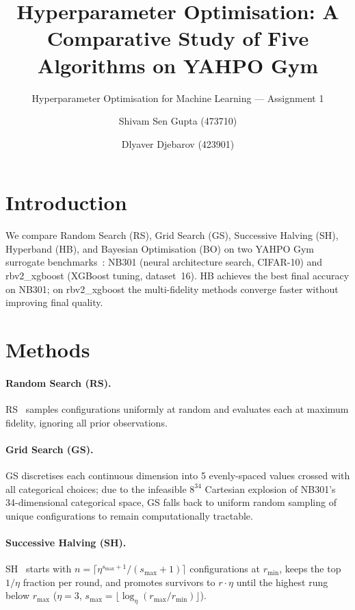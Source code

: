 \documentclass{AIM_report}
\title{Hyperparameter Optimisation: A Comparative Study of Five Algorithms on YAHPO Gym}
\subtitle{Hyperparameter Optimisation for Machine Learning --- Assignment 1}
\author{Shivam Sen Gupta (473710) \and Dlyaver Djebarov (423901)}
\institute{RWTH Aachen University, Germany\\
\email{shivam.sengupta@rwth-aachen.de, dlyaver.djebarov@rwth-aachen.de}}
\begin{document}
\maketitle

\section{Introduction}

We compare Random Search (RS), Grid Search (GS), Successive Halving (SH),
Hyperband (HB), and Bayesian Optimisation (BO) on two YAHPO Gym surrogate
benchmarks~\cite{pfisterer2022yahpo}: NB301 (neural architecture search,
CIFAR-10) and rbv2\_xgboost (XGBoost tuning, dataset~16).
HB achieves the best final accuracy on NB301; on rbv2\_xgboost the
multi-fidelity methods converge faster without improving final quality.

\section{Methods}

\paragraph{Random Search (RS).}
RS~\cite{bergstra2012random} samples configurations uniformly at random
and evaluates each at maximum fidelity, ignoring all prior observations.

\paragraph{Grid Search (GS).}
GS discretises each continuous dimension into 5 evenly-spaced values
crossed with all categorical choices; due to the infeasible $8^{34}$
Cartesian explosion of NB301's 34-dimensional categorical space, GS
falls back to uniform random sampling of unique configurations to remain
computationally tractable.

\paragraph{Successive Halving (SH).}
SH~\cite{jamieson2016non} starts with $n{=}\lceil\eta^{s_{\max}+1}/(s_{\max}+1)\rceil$
configurations at $r_{\min}$, keeps the top $1/\eta$ fraction per round,
and promotes survivors to $r \cdot\eta$ until the highest rung below
$r_{\max}$ ($\eta{=}3$, $s_{\max}{=}\lfloor\log_\eta(r_{\max}/r_{\min})\rfloor$).
\end{document}
